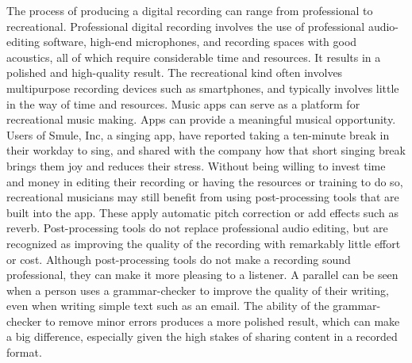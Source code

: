 The process of producing a digital recording can range from professional to recreational. Professional digital recording involves the use of professional audio-editing software, high-end microphones, and recording spaces with good acoustics, all of which require considerable time and resources. It results in a polished and high-quality result. The recreational kind often involves multipurpose recording devices such as smartphones, and typically involves little in the way of time and resources. Music apps can serve as a platform for recreational music making. Apps can provide a meaningful musical opportunity. Users of Smule, Inc, a singing app, have reported taking a ten-minute break in their workday to sing, and shared with the company how that short singing break brings them joy and reduces their stress. Without being willing to invest time and money in editing their recording or having the resources or training to do so, recreational musicians may still benefit from using post-processing tools that are built into the app. These apply automatic pitch correction or add effects such as reverb. Post-processing tools do not replace professional audio editing, but are recognized as improving the quality of the recording with remarkably little effort or cost. Although post-processing tools do not make a recording sound professional, they can make it more pleasing to a listener. A parallel can be seen when a person uses a grammar-checker to improve the quality of their writing, even when writing simple text such as an email. The ability of the grammar-checker to remove minor errors produces a more polished result, which can make a big difference, especially given the high stakes of sharing content in a recorded format.


